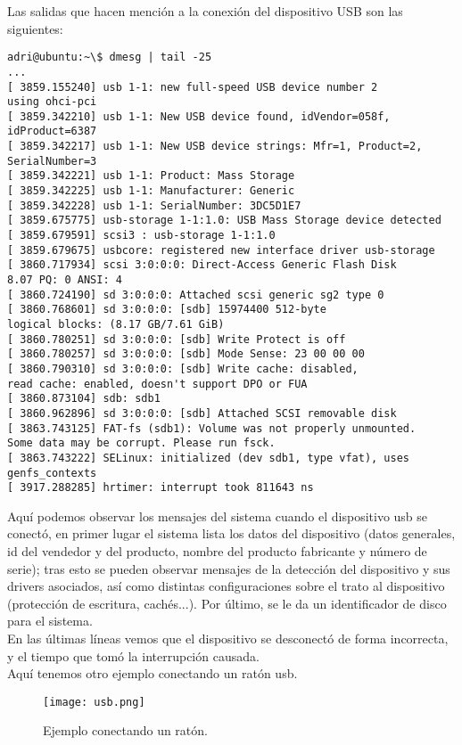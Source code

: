 \documentclass[a4paper, 11pt]{article} %
\begin{document}
\cite{9} Las salidas que hacen mención a la conexión del dispositivo USB son las siguientes:
\begin{verbatim}
adri@ubuntu:~\$ dmesg | tail -25
...
[ 3859.155240] usb 1-1: new full-speed USB device number 2
using ohci-pci
[ 3859.342210] usb 1-1: New USB device found, idVendor=058f,
idProduct=6387 
[ 3859.342217] usb 1-1: New USB device strings: Mfr=1, Product=2,
SerialNumber=3 
[ 3859.342221] usb 1-1: Product: Mass Storage 
[ 3859.342225] usb 1-1: Manufacturer: Generic 
[ 3859.342228] usb 1-1: SerialNumber: 3DC5D1E7 
[ 3859.675775] usb-storage 1-1:1.0: USB Mass Storage device detected 
[ 3859.679591] scsi3 : usb-storage 1-1:1.0 
[ 3859.679675] usbcore: registered new interface driver usb-storage 
[ 3860.717934] scsi 3:0:0:0: Direct-Access Generic Flash Disk
8.07 PQ: 0 ANSI: 4 
[ 3860.724190] sd 3:0:0:0: Attached scsi generic sg2 type 0 
[ 3860.768601] sd 3:0:0:0: [sdb] 15974400 512-byte
logical blocks: (8.17 GB/7.61 GiB) 
[ 3860.780251] sd 3:0:0:0: [sdb] Write Protect is off 
[ 3860.780257] sd 3:0:0:0: [sdb] Mode Sense: 23 00 00 00 
[ 3860.790310] sd 3:0:0:0: [sdb] Write cache: disabled, 
read cache: enabled, doesn't support DPO or FUA 
[ 3860.873104] sdb: sdb1 
[ 3860.962896] sd 3:0:0:0: [sdb] Attached SCSI removable disk 
[ 3863.743125] FAT-fs (sdb1): Volume was not properly unmounted.
Some data may be corrupt. Please run fsck. 
[ 3863.743222] SELinux: initialized (dev sdb1, type vfat), uses
genfs_contexts 
[ 3917.288285] hrtimer: interrupt took 811643 ns
\end{verbatim}

Aquí podemos observar los mensajes del sistema cuando el dispositivo usb se conectó, en primer lugar el sistema lista los datos del dispositivo (datos generales, id del vendedor y del producto, nombre del producto fabricante y número de serie); tras esto se pueden observar mensajes de la detección del dispositivo y sus drivers asociados, así como distintas configuraciones sobre el trato al dispositivo (protección de escritura, cachés...). Por último, se le da un identificador de disco para el sistema.\\
En las últimas líneas vemos que el dispositivo se desconectó de forma incorrecta, y el tiempo que tomó la interrupción causada.\\
Aquí tenemos otro ejemplo conectando un ratón usb.

\begin{figure}[H]
\centering 
\texttt{[image: usb.png]} 
\caption{Ejemplo conectando un ratón.} 
\label{contexto:figura} 
\end{figure}
\end{document}
